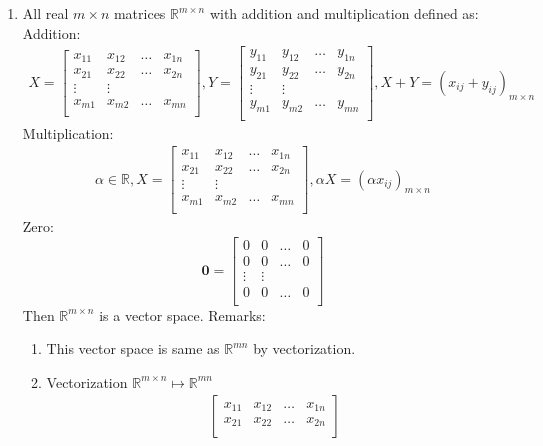 \documentclass[11pt]{article}
\newcommand{\R}{\mathbb{R}}
\newcommand{\vzero}{\mathbf{0}}
\begin{document}
\begin{enumerate}
\item All real $m \times n$ matrices $\R^{m \times n}$ with addition and multiplication defined as:\\
Addition:
\begin{align*}
X = \begin{bmatrix}
x_{11} & x_{12}& \dots& x_{1n}\\
x_{21} & x_{22}& \dots& x_{2n}\\
\vdots & \vdots& \\
x_{m1} & x_{m2}& \dots& x_{mn}\\
\end{bmatrix}, 
Y = \begin{bmatrix}
y_{11} & y_{12}& \dots& y_{1n}\\
y_{21} & y_{22}& \dots& y_{2n}\\
\vdots & \vdots& \\
y_{m1} & y_{m2}& \dots& y_{mn}\\
\end{bmatrix}, X+Y = (x_{ij} + y_{ij})_{m \times n}
\end{align*}
Multiplication:
\begin{align*}
\alpha \in \R, X = \begin{bmatrix}
x_{11} & x_{12}& \dots& x_{1n}\\
x_{21} & x_{22}& \dots& x_{2n}\\
\vdots & \vdots& \\
x_{m1} & x_{m2}& \dots& x_{mn}\\
\end{bmatrix},  \alpha X = (\alpha x_{ij})_{m \times n}
\end{align*}
Zero: $$ \vzero = \begin{bmatrix}
0& 0& \dots& 0\\ 
0& 0& \dots& 0\\ 
\vdots& \vdots& \\
0& 0& \dots& 0\\ 
\end{bmatrix}$$
Then $\R^{m \times n}$ is a vector space.
Remarks: \begin{enumerate}
\item This vector space is same as $\R^{mn}$ by vectorization.
\item Vectorization $\R^{m \times n} \mapsto \R^{mn}$ \begin{align*}
\begin{bmatrix}
x_{11} & x_{12}& \dots& x_{1n}\\
x_{21} & x_{22}& \dots& x_{2n}\\

\end{bmatrix}
\end{align*}
\end{enumerate}
\end{enumerate}
\end{document}
